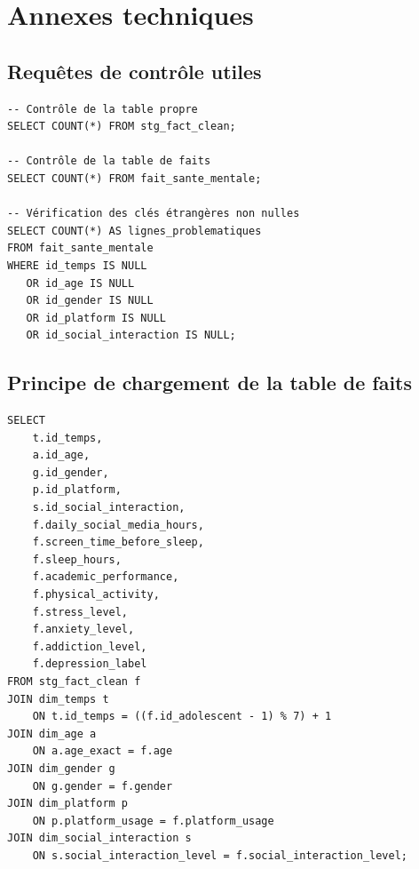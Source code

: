 \documentclass[11pt,a4paper]{report}
\begin{document}
\chapter{Annexes techniques}

\section{Requêtes de contrôle utiles}

\begin{codebox}
\begin{lstlisting}[style=sqlstyle]
-- Contrôle de la table propre
SELECT COUNT(*) FROM stg_fact_clean;

-- Contrôle de la table de faits
SELECT COUNT(*) FROM fait_sante_mentale;

-- Vérification des clés étrangères non nulles
SELECT COUNT(*) AS lignes_problematiques
FROM fait_sante_mentale
WHERE id_temps IS NULL
   OR id_age IS NULL
   OR id_gender IS NULL
   OR id_platform IS NULL
   OR id_social_interaction IS NULL;
\end{lstlisting}
\end{codebox}
\clearpage %
\section{Principe de chargement de la table de faits}

\begin{codebox}
\begin{lstlisting}[style=sqlstyle]
SELECT
    t.id_temps,
    a.id_age,
    g.id_gender,
    p.id_platform,
    s.id_social_interaction,
    f.daily_social_media_hours,
    f.screen_time_before_sleep,
    f.sleep_hours,
    f.academic_performance,
    f.physical_activity,
    f.stress_level,
    f.anxiety_level,
    f.addiction_level,
    f.depression_label
FROM stg_fact_clean f
JOIN dim_temps t
    ON t.id_temps = ((f.id_adolescent - 1) % 7) + 1
JOIN dim_age a
    ON a.age_exact = f.age
JOIN dim_gender g
    ON g.gender = f.gender
JOIN dim_platform p
    ON p.platform_usage = f.platform_usage
JOIN dim_social_interaction s
    ON s.social_interaction_level = f.social_interaction_level;
\end{lstlisting}
\end{codebox}
\end{document}
